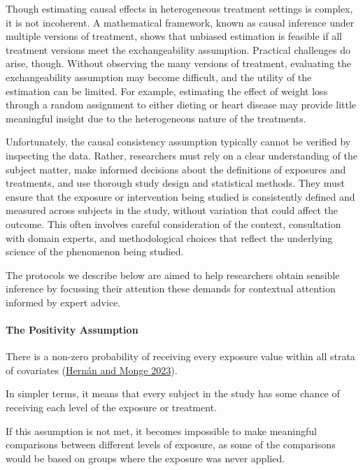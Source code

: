 \documentclass[
  singlecolumn]{article}
\let\oldparagraph\paragraph
\renewcommand{\paragraph}[1]{\oldparagraph{#1}\mbox{}}
\begin{document}
Though estimating causal effects in heterogeneous treatment settings is
complex, it is not incoherent. A mathematical framework, known as causal
inference under multiple versions of treatment, shows that unbiased
estimation is feasible if all treatment versions meet the
exchangeability assumption. Practical challenges do arise, though.
Without observing the many versions of treatment, evaluating the
exchangeability assumption may become difficult, and the utility of the
estimation can be limited. For example, estimating the effect of weight
loss through a random assignment to either dieting or heart disease may
provide little meaningful insight due to the heterogeneous nature of the
treatments.

Unfortunately, the causal consistency assumption typically cannot be
verified by inspecting the data. Rather, researchers must rely on a
clear understanding of the subject matter, make informed decisions about
the definitions of exposures and treatments, and use thorough study
design and statistical methods. They must ensure that the exposure or
intervention being studied is consistently defined and measured across
subjects in the study, without variation that could affect the outcome.
This often involves careful consideration of the context, consultation
with domain experts, and methodological choices that reflect the
underlying science of the phenomenon being studied.

The protocols we describe below are aimed to help researchers obtain
sensible inference by focussing their attention these demands for
contextual attention informed by expert advice.

\paragraph{\texorpdfstring{\textbf{The Positivity
Assumption}}{The Positivity Assumption}}\label{the-positivity-assumption}

There is a non-zero probability of receiving every exposure value within
all strata of covariates (\hyperref[ref-hernuxe1n2023]{Hernán and Monge
2023}).

In simpler terms, it means that every subject in the study has some
chance of receiving each level of the exposure or treatment.

If this assumption is not met, it becomes impossible to make meaningful
comparisons between different levels of exposure, as some of the
comparisons would be based on groups where the exposure was never
applied.
\end{document}
